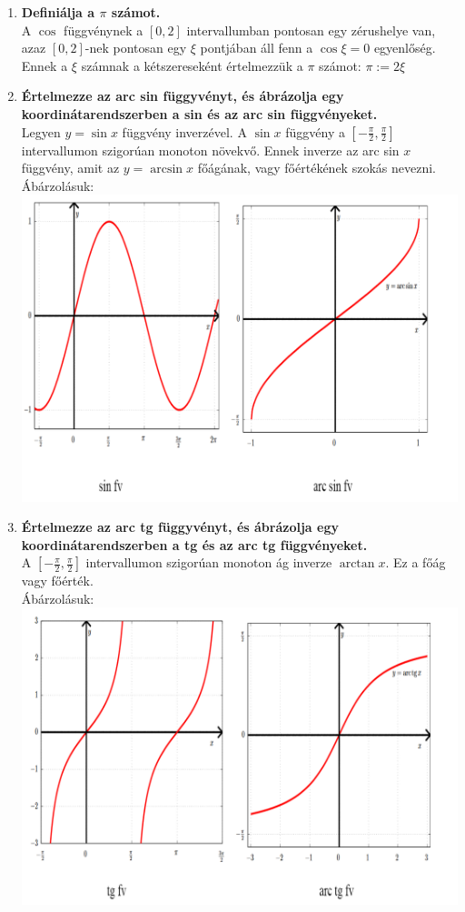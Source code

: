 \documentclass[a4paper,11pt]{article}
\begin{document}
\def\Z{\mathbb{Z}}
\def\R{\mathbb{R}}
\def\rtr{\R\to\R}
\def\D{\mathcal{D}}
\def\dab{\in\D(a,b)}
\def\fabr{f:(a,b)\to\R}
\begin{enumerate}
	\item \textbf{Definiálja a $\pi$ számot.}\\[0.1cm]A $\cos$ függvénynek a $[0,2]$ intervallumban pontosan egy zérushelye van, azaz $[0,2]$-nek pontosan egy $\xi$ pontjában áll fenn a $\cos\xi=0$ egyenlőség. Ennek a $\xi$ számnak a kétszereseként értelmezzük a $\pi$ számot: $\pi:=2\xi$
	\item \textbf{Értelmezze az arc sin függyvényt, és ábrázolja egy koordinátarendszerben a sin és az arc sin függvényeket.}\\[0.1cm]Legyen $y=\sin x$ függvény inverzével. A $\sin x$ függvény a $[-\frac{\pi}{2},\frac{\pi}{2}]$ intervallumon szigorúan monoton növekvő. Ennek inverze az arc sin $x$ függvény, amit az $y=\arcsin x$ főágának, vagy főértékének szokás nevezni.\\[0.1cm]Ábárzolásuk:\\[0.1cm]
	\includegraphics[width=15cm]{kepek/sin.png}
	\item \textbf{Értelmezze az arc tg függyvényt, és ábrázolja egy koordinátarendszerben a tg és az arc tg függvényeket.}\\[0.1cm]A $[-\frac{\pi}{2},\frac{\pi}{2}]$ intervallumon szigorúan monoton ág inverze $\arctan x$. Ez a főág vagy főérték.\\[0.1cm]Ábárzolásuk:\\[0.1cm]
	\includegraphics[width=15cm]{kepek/tan.png}

\end{enumerate}
\end{document}
